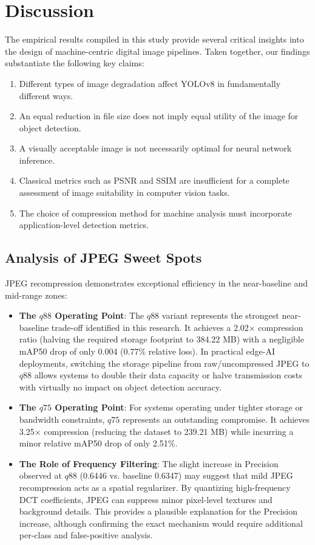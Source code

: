 \documentclass[12pt, a4paper]{article}
\begin{document}
\section{Discussion}
The empirical results compiled in this study provide several critical insights into the design of machine-centric digital image pipelines. Taken together, our findings substantiate the following key claims:
\begin{enumerate}
    \item Different types of image degradation affect YOLOv8 in fundamentally different ways.
    \item An equal reduction in file size does not imply equal utility of the image for object detection.
    \item A visually acceptable image is not necessarily optimal for neural network inference.
    \item Classical metrics such as PSNR and SSIM are insufficient for a complete assessment of image suitability in computer vision tasks.
    \item The choice of compression method for machine analysis must incorporate application-level detection metrics.
\end{enumerate}

\subsection{Analysis of JPEG Sweet Spots}
JPEG recompression demonstrates exceptional efficiency in the near-baseline and mid-range zones:
\begin{itemize}
    \item \textbf{The $q88$ Operating Point}: The $q88$ variant represents the strongest near-baseline trade-off identified in this research. It achieves a 2.02$\times$ compression ratio (halving the required storage footprint to 384.22 MB) with a negligible mAP50 drop of only 0.004 (0.77\% relative loss). In practical edge-AI deployments, switching the storage pipeline from raw/uncompressed JPEG to $q88$ allows systems to double their data capacity or halve transmission costs with virtually no impact on object detection accuracy.
    \item \textbf{The $q75$ Operating Point}: For systems operating under tighter storage or bandwidth constraints, $q75$ represents an outstanding compromise. It achieves 3.25$\times$ compression (reducing the dataset to 239.21 MB) while incurring a minor relative mAP50 drop of only 2.51\%.
    \item \textbf{The Role of Frequency Filtering}: The slight increase in Precision observed at $q88$ (0.6446 vs. baseline 0.6347) may suggest that mild JPEG recompression acts as a spatial regularizer. By quantizing high-frequency DCT coefficients, JPEG can suppress minor pixel-level textures and background details. This provides a plausible explanation for the Precision increase, although confirming the exact mechanism would require additional per-class and false-positive analysis.
\end{itemize}
\end{document}
